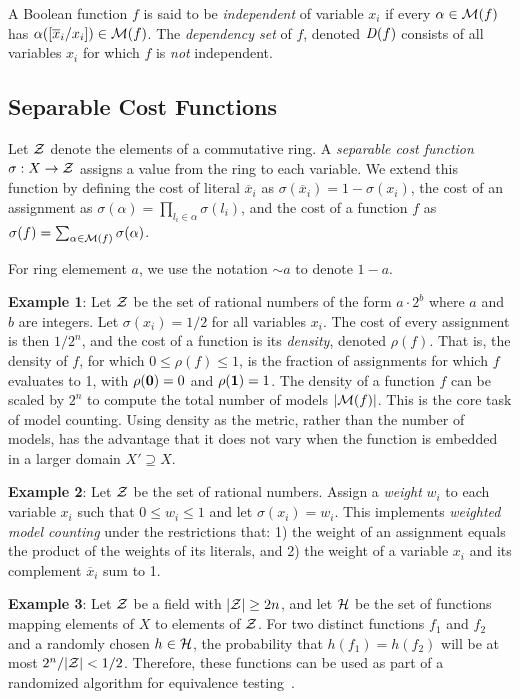 \documentclass{llncs}
\newcommand{\one}{\mbox{\bf 1}}
\newcommand{\zero}{\mbox{\bf 0}}
\newcommand{\obar}[1]{\overline{#1}}
\newcommand{\oneminus}{{\sim}}
\newcommand{\interp}{\alpha}
\newcommand{\interpset}[1]{{\cal M}(#1)}
\newcommand{\ring}{{\cal Z}}
\newcommand{\cost}{\sigma}
\newcommand{\density}{\rho}
\newcommand{\hashset}{{\cal H}}
\newcommand{\fhash}{h}
\newcommand{\depend}{{\it D}}
\newcommand{\subs}[2]{[#2/#1]}
\begin{document}
A Boolean function $f$ is said to be {\em independent} of variable
$x_i$ if every $\interp \in \interpset{f}$ has
$\interp(\subs{x_i}{\obar{x}_i}) \in \interpset{f}$.
The {\em dependency set} of $f$, denoted
$\depend(f)$ consists of all variables $x_i$ for which $f$ is {\em
  not} independent.

\subsection{Separable Cost Functions}

Let $\ring$ denote the elements of a commutative ring.  A {\em
  separable cost function} $\cost:X \rightarrow \ring$ assigns a value
from the ring to each variable.  We extend this function by defining
the cost of literal $\obar{x}_i$ as $\cost(\obar{x}_i) = 1 - \cost(x_i)$, the cost
of an assignment as
$\cost(\interp) = \prod_{l_i \in \interp} \cost(l_i)$,
and the cost of a function $f$ as
$\cost(f) = \sum_{\interp \in \interpset{f}} \cost(\interp)$.

For ring elemement $a$, we use the notation $\oneminus a$ to denote $1 - a$.

{\bf Example 1}: Let $\ring$ be the set of rational numbers of the form $a\cdot 2^b$ where $a$ and $b$ are integers.
Let $\cost(x_i) = 1/2$ for all variables $x_i$.  The cost of every
assignment is then $1/2^{n}$, and the cost of a function is its
{\em density}, denoted $\density(f)$.  That is, the density of $f$, for which
$0 \leq \density(f) \leq 1$, 
is the fraction of assignments for which $f$
evaluates to 1, with $\density(\zero) = 0$ and $\density(\one) = 1$.  The density of a function
$f$ can be scaled by $2^n$ to compute the total number of models
$|\interpset{f}|$.  This is the core task of model counting.  Using
density as the metric, rather than the number of models, has the advantage that it does not vary when the
function is embedded in a larger domain $X' \supseteq X$.  

{\bf Example 2}: Let $\ring$ be the set of rational numbers.  Assign a
{\em weight} $w_i$ to each variable $x_i$ such that $0 \leq w_i \leq
1$ and let $\cost(x_i) = w_i$.  This implements {\em weighted model counting}
under the restrictions that: 
1) the
weight of an assignment equals the product of the weights of its
literals, and 2) the weight of a variable $x_i$ and its complement
$\obar{x}_i$ sum to 1.


{\bf Example 3}: Let $\ring$ be a field with $|\ring| \geq 2n$,
and let $\hashset$ be the set of functions
mapping elements of $X$ to elements of $\ring$.  For
two distinct functions $f_1$ and $f_2$ and a randomly chosen $\fhash
\in \hashset$, the probability that $h(f_1) = h(f_2)$ will be at most
$2^n/|\ring|< 1/2$.  Therefore, these functions can be used as part of a
randomized algorithm for equivalence testing~\cite{blum:ipl:1980}.
\end{document}
